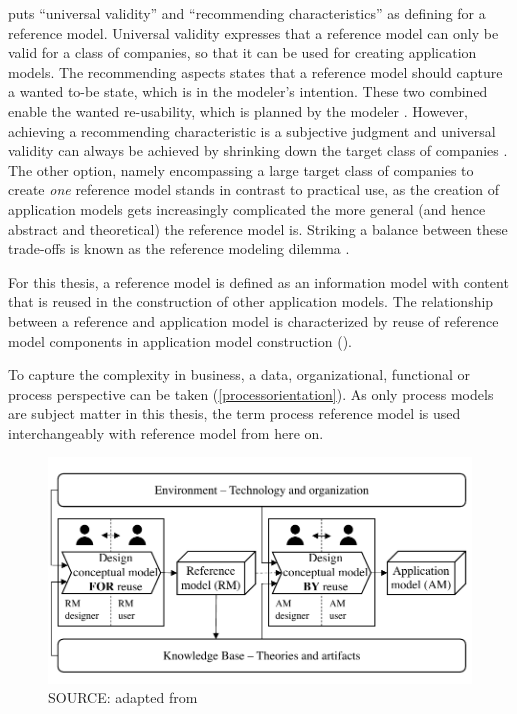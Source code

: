 			\citep{Schutte1998} puts \enquote{universal validity} and \enquote{recommending characteristics} as defining  for a reference model. Universal validity expresses that a reference model can only be valid for a class of companies, so that it can be used for creating application models. The recommending aspects states that a reference model should capture a wanted to-be state, which is in the modeler's intention. These two combined enable the wanted re-usability, which is planned by the modeler \citep[]{brocke2003referenzmodellierung}. However, achieving a recommending characteristic is a subjective judgment and universal validity can always be achieved by shrinking down the target class of companies \citep{thomas2006a}. The other option, namely encompassing a large target class of companies to create \textit{one} reference model stands in contrast to practical use, as the creation of application models gets increasingly complicated the more general (and hence abstract and theoretical) \citep[]{Schutte1998} the reference model is. Striking a balance between these trade-offs is known as the reference modeling dilemma \citep{delfmann2006adaptive}. 
		
			For this thesis, a reference model is defined as an information model with content that is reused in the construction of other application models. The relationship between a reference and application model is characterized by reuse of reference model components in application model construction (\cf \cite{Puster2015,brocke2003referenzmodellierung}). 
			
			To capture the complexity in business, a data, organizational, functional or process perspective can be taken (\cf \ref{processorientation}). As only process models are subject matter in this thesis, the term process reference model is used interchangeably with reference model from here on. 
				  
				  
				  
				  \begin{figure}[caption={Design Process of Reusable Conceptual Models}, label={fig:refmodconst}]
				  	{	\includegraphics[width=.8\textwidth]{figures/refmodconst.pdf}}
				  	\hspace{6.2cm}	SOURCE:  adapted from \citep[]{vom2006reusable}
				  \end{figure} 
				  
